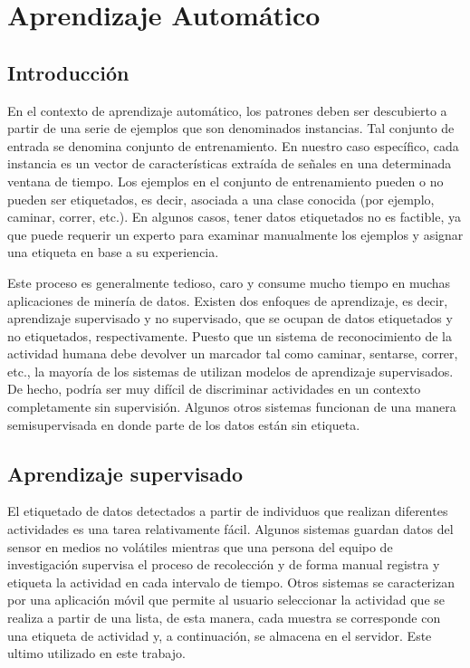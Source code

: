 
\chapter{Aprendizaje Automático}

\label{chap3:Aprendizaje-Automatico}

\section{Introducción}

En el contexto de aprendizaje automático, los patrones deben ser descubierto
a partir de una serie de ejemplos que son denominados instancias.
Tal conjunto de entrada se denomina conjunto de entrenamiento. En
nuestro caso específico, cada instancia es un vector de características
extraída de señales en una determinada ventana de tiempo. Los ejemplos
en el conjunto de entrenamiento pueden o no pueden ser etiquetados,
es decir, asociada a una clase conocida (por ejemplo, caminar, correr,
etc.). En algunos casos, tener datos etiquetados no es factible, ya
que puede requerir un experto para examinar manualmente los ejemplos
y asignar una etiqueta en base a su experiencia.

Este proceso es generalmente tedioso, caro y consume mucho tiempo
en muchas aplicaciones de minería de datos. Existen dos enfoques de
aprendizaje, es decir, aprendizaje supervisado y no supervisado, que
se ocupan de datos etiquetados y no etiquetados, respectivamente.
Puesto que un sistema de reconocimiento de la actividad humana debe
devolver un marcador tal como caminar, sentarse, correr, etc., la
mayoría de los sistemas de  utilizan modelos de aprendizaje
supervisados. De hecho, podría ser muy difícil de discriminar actividades
en un contexto completamente sin supervisión. Algunos otros sistemas
funcionan de una manera semisupervisada en donde parte de los datos
están sin etiqueta.

\section{Aprendizaje supervisado}

El etiquetado de datos detectados a partir de individuos que realizan
diferentes actividades es una tarea relativamente fácil. Algunos sistemas
guardan datos del sensor en medios no volátiles mientras que una persona
del equipo de investigación supervisa el proceso de recolección y
de forma manual registra y etiqueta la actividad en cada intervalo
de tiempo. Otros sistemas se caracterizan por una aplicación móvil
que permite al usuario seleccionar la actividad que se realiza a partir
de una lista, de esta manera, cada muestra se corresponde con una
etiqueta de actividad y, a continuación, se almacena en el servidor.
Este ultimo utilizado en este trabajo.

